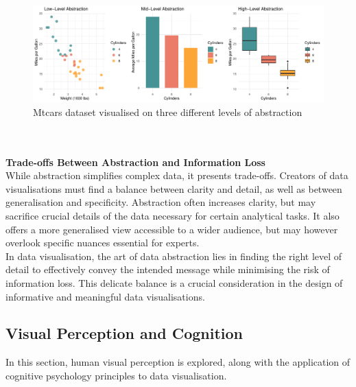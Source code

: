 \documentclass{article}\usepackage[]{graphicx}\usepackage[]{xcolor}
\makeatletter
\def\maxwidth{ %
  \ifdim\Gin@nat@width>\linewidth
    \linewidth
  \else
    \Gin@nat@width
  \fi
}
\newenvironment{knitrout}{}{} %
\numberwithin{equation}{section}
\makeatother
\begin{document}
\begin{knitrout}\scriptsize
{}\color{fgcolor}\begin{figure}[H]

{\centering \includegraphics[width=\maxwidth]{figure/beamer-abs-plots-1} 

}

\caption[Mtcars dataset visualised on three different levels of abstraction]{Mtcars dataset visualised on three different levels of abstraction}\label{fig:abs-plots}
\end{figure}

\end{knitrout}
\\
\\
\noindent \textbf{Trade-offs Between Abstraction and Information Loss}\\
While abstraction simplifies complex data, it presents trade-offs. Creators of data visualisations must find a balance between clarity and detail, as well as between generalisation and specificity. Abstraction often increases clarity, but may sacrifice crucial details of the data necessary for certain analytical tasks. It also offers a more generalised view accessible to a wider audience, but may however overlook specific nuances essential for experts.\\ 

\noindent 
In data visualisation, the art of data abstraction lies in finding the right level of detail to effectively convey the intended message while minimising the risk of information loss. This delicate balance is a crucial consideration in the design of informative and meaningful data visualisations.

\subsection{Visual Perception and Cognition}
In this section, human visual perception is explored, along with the application of cognitive psychology principles to data visualisation.\\ 
\end{document}
